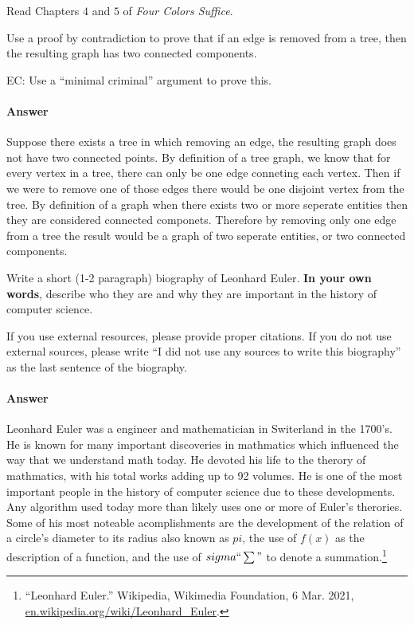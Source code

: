 \documentclass{article}
\begin{document}

\collab{\todo{}} 

Read Chapters $4$ and $5$ of \emph{Four Colors Suffice}.

Use a proof by contradiction to prove that if an edge is removed from a
tree, then the resulting graph has two connected components.

EC:
Use a ``minimal criminal'' argument to prove this.

        \paragraph{Answer}

       Suppose there exists a tree in which removing an edge, the resulting graph does not have two connected points. By definition of a tree graph, we know that for every vertex in a tree, there can only be one edge conneting each vertex. Then if we were to remove one of those edges there would be one disjoint vertex from the tree. By definition of a graph when there exists two or more seperate entities then they are considered connected componets. Therefore by removing only one edge from a tree the result would be a graph of two seperate entities, or two connected components.


Write a short (1-2 paragraph) biography of Leonhard Euler.
\textbf{In your own words}, describe who they are and why they are important in
the history of computer science.

If you use external resources, please provide
proper citations. If you do not use external sources, please write ``I did not
use any sources to write this biography'' as the last sentence of the
biography.

\paragraph{Answer}

Leonhard Euler was a engineer and mathematician in Switerland in the 1700's. He is known for many important discoveries in mathmatics which influenced the way that we understand math today. He devoted his life to the therory of mathmatics, with his total works adding up to 92 volumes. He is one of the most important people in the history of computer science due to these developments. Any algorithm used today more than likely uses one or more of Euler's therories. Some of his most noteable acomplishments are the development of the relation of a circle's diameter to its radius also known as $pi$, the use of $f(x)$ as the description of a function, and the use of $sigma ``\sum"$ to denote a summation.\footnote{“Leonhard Euler.” Wikipedia, Wikimedia Foundation, 6 Mar. 2021, \url{en.wikipedia.org/wiki/Leonhard_Euler}.} 

% 
% 
\end{document}
